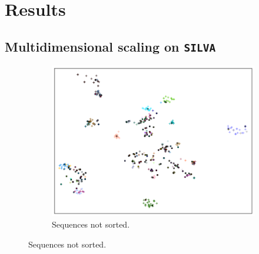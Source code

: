 \section{Results}

\subsection{Multidimensional scaling on \texttt{SILVA}}
\label{app:mds_silva}

\begin{figure}[H]
  \centering
  \begin{subfigure}[t]{1.0\textwidth}
    \includegraphics[width=1.0\textwidth]{graphics/SILVA_t-SNE_500.png}
    \caption{Sequences not sorted.}
    \label{fig:mds_silva_no_sort}
  \end{subfigure}
\end{figure}
\clearpage

